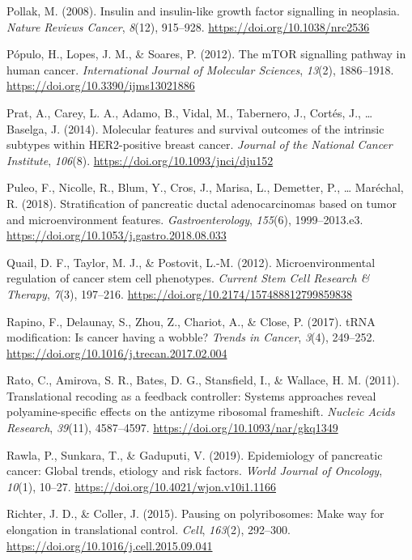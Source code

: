 \documentclass[12pt,openany]{book}
\begin{document}
\hypertarget{ref-Pollak2008}{}
Pollak, M. (2008). Insulin and insulin-like growth factor signalling in
neoplasia. \emph{Nature Reviews Cancer}, \emph{8}(12), 915--928.
\url{https://doi.org/10.1038/nrc2536}

\hypertarget{ref-Populo2012}{}
Pópulo, H., Lopes, J. M., \& Soares, P. (2012). The mTOR signalling
pathway in human cancer. \emph{International Journal of Molecular
Sciences}, \emph{13}(2), 1886--1918.
\url{https://doi.org/10.3390/ijms13021886}

\hypertarget{ref-Prat2014}{}
Prat, A., Carey, L. A., Adamo, B., Vidal, M., Tabernero, J., Cortés, J.,
\ldots{} Baselga, J. (2014). Molecular features and survival outcomes of
the intrinsic subtypes within HER2-positive breast cancer. \emph{Journal
of the National Cancer Institute}, \emph{106}(8).
\url{https://doi.org/10.1093/jnci/dju152}

\hypertarget{ref-Puleo2018}{}
Puleo, F., Nicolle, R., Blum, Y., Cros, J., Marisa, L., Demetter, P.,
\ldots{} Maréchal, R. (2018). Stratification of pancreatic ductal
adenocarcinomas based on tumor and microenvironment features.
\emph{Gastroenterology}, \emph{155}(6), 1999--2013.e3.
\url{https://doi.org/10.1053/j.gastro.2018.08.033}

\hypertarget{ref-Quail2012}{}
Quail, D. F., Taylor, M. J., \& Postovit, L.-M. (2012).
Microenvironmental regulation of cancer stem cell phenotypes.
\emph{Current Stem Cell Research \& Therapy}, \emph{7}(3), 197--216.
\url{https://doi.org/10.2174/157488812799859838}

\hypertarget{ref-Rapino2017}{}
Rapino, F., Delaunay, S., Zhou, Z., Chariot, A., \& Close, P. (2017).
tRNA modification: Is cancer having a wobble? \emph{Trends in Cancer},
\emph{3}(4), 249--252.
\url{https://doi.org/10.1016/j.trecan.2017.02.004}

\hypertarget{ref-Rato2011}{}
Rato, C., Amirova, S. R., Bates, D. G., Stansfield, I., \& Wallace, H.
M. (2011). Translational recoding as a feedback controller: Systems
approaches reveal polyamine-specific effects on the antizyme ribosomal
frameshift. \emph{Nucleic Acids Research}, \emph{39}(11), 4587--4597.
\url{https://doi.org/10.1093/nar/gkq1349}

\hypertarget{ref-Rawla2019}{}
Rawla, P., Sunkara, T., \& Gaduputi, V. (2019). Epidemiology of
pancreatic cancer: Global trends, etiology and risk factors. \emph{World
Journal of Oncology}, \emph{10}(1), 10--27.
\url{https://doi.org/10.4021/wjon.v10i1.1166}

\hypertarget{ref-Richter2015}{}
Richter, J. D., \& Coller, J. (2015). Pausing on polyribosomes: Make way
for elongation in translational control. \emph{Cell}, \emph{163}(2),
292--300. \url{https://doi.org/10.1016/j.cell.2015.09.041}
\end{document}
